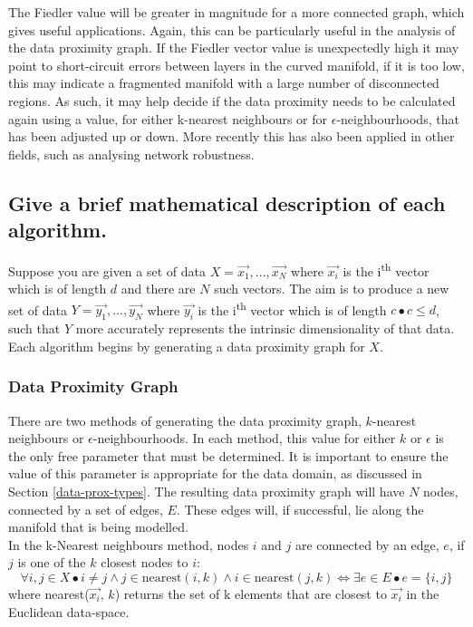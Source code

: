 \documentclass{article}
\begin{document}
\label{data-prox-types}
The Fiedler value will be greater in magnitude for a more connected graph, which gives useful applications. Again, this can be particularly useful in the analysis of the data proximity graph. If the Fiedler vector value is unexpectedly high it may point to short-circuit errors between layers in the curved manifold, if it is too low, this may indicate a fragmented manifold with a large number of disconnected regions\cite{isomap_stability}. As such, it may help decide if the data proximity needs to be calculated again using a value, for either k-nearest neighbours or for $\epsilon$-neighbourhoods, that has been adjusted up or down. More recently this has also been applied in other fields, such as analysing network robustness\cite{fiedler_networks, fiedler_networks2}.

\subsection{Give a brief mathematical description of each algorithm.}
Suppose you are given a set of data $X = {\vec{x_1}, ..., \vec{x_N}}$ where $\vec{x_i}$ is the i\textsuperscript{th} vector which is of length $d$ and there are $N$ such vectors. The aim is to produce a new set of data $Y = {\vec{y_1}, ..., \vec{y_N}}$ where $\vec{y_i}$ is the i\textsuperscript{th} vector which is of length $c \bullet c \leq d$, such that $Y$ more accurately represents the intrinsic dimensionality of that data. Each algorithm begins by generating a data proximity graph for $X$.\\

\subsubsection{Data Proximity Graph}
There are two methods of generating the data proximity graph, $k$-nearest neighbours or $\epsilon$-neighbourhoods. In each method, this value for either $k$ or $\epsilon$ is the only free parameter that must be determined. It is important to ensure the value of this parameter is appropriate for the data domain, as discussed in Section \ref{data-prox-types}. The resulting data proximity graph will have $N$ nodes, connected by a set of edges, $E$. These edges will, if successful, lie along the manifold that is being modelled.\\

In the k-Nearest neighbours method, nodes $i$ and $j$ are connected by an edge, $e$, if $j$ is one of the $k$ closest nodes to $i$:
\[ \forall i, j \in X \bullet i \ne j \land j \in \mathrm{nearest}(i, k) \land i \in \mathrm{nearest}(j, k) \Leftrightarrow \exists e \in E \bullet e = \{i, j\} \]
where nearest($\vec{x_i}$, $k$) returns the set of k elements that are closest to $\vec{x_i}$ in the Euclidean data-space.\\
\end{document}
